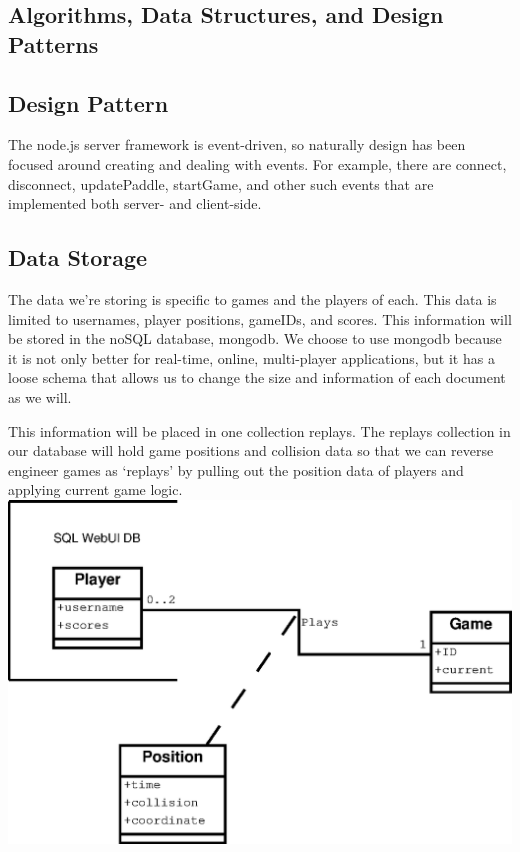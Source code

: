 \documentclass[letterpaper,12pt]{article}
\begin{document}
\subsection{Algorithms, Data Structures, and Design Patterns}
\subsection{Design Pattern}
The node.js server framework is event-driven, so naturally design has been focused around creating and dealing with events.
For example, there are connect, disconnect, updatePaddle, startGame, and other such events that are implemented both server- and client-side.

\subsection{Data Storage}
The data we’re storing is specific to games and the players of each. This data is limited to usernames, player positions, gameIDs, and scores. This information will be stored in the noSQL database, mongodb. We choose to use mongodb because it is not only better for real-time, online, multi-player applications, but it has a loose schema that allows us to change the size and information of each document as we will.

This information will be placed in one collection replays. The replays collection in our database will hold game positions and collision data so that we can reverse engineer games as ‘replays’ by pulling out the position data of players and applying current game logic. \\

\includegraphics{ERdia.eps} \\
\end{document}
